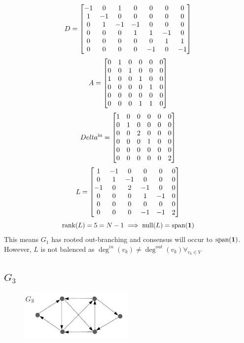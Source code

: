 \documentclass[]{article}
\numberwithin{equation}{section}
\begin{document}
\[
    D = \mqty[
        -1 & 0  & 1  & 0  & 0  & 0  & 0  \\
        1  & -1 & 0  & 0  & 0  & 0  & 0  \\
        0  & 1  & -1 & -1 & 0  & 0  & 0  \\
        0  & 0  & 0  & 1  & 1  & -1 & 0  \\
        0  & 0  & 0  & 0  & 0  & 1  & 1  \\
        0  & 0  & 0  & 0  & -1 & 0  & -1
    ]
\]\[
    A = \mqty[
        0 & 1 & 0 & 0 & 0 & 0 \\
        0 & 0 & 1 & 0 & 0 & 0 \\
        1 & 0 & 0 & 1 & 0 & 0 \\
        0 & 0 & 0 & 0 & 1 & 0 \\
        0 & 0 & 0 & 0 & 0 & 0 \\
        0 & 0 & 0 & 1 & 1 & 0
    ]
\]\[
    Delta^{\text{in}} = \mqty[
        1 & 0 & 0 & 0 & 0 & 0 \\
        0 & 1 & 0 & 0 & 0 & 0 \\
        0 & 0 & 2 & 0 & 0 & 0 \\
        0 & 0 & 0 & 1 & 0 & 0 \\
        0 & 0 & 0 & 0 & 0 & 0 \\
        0 & 0 & 0 & 0 & 0 & 2
    ]
\]\[
    L = \mqty[
        1  & -1 & 0  & 0  & 0  & 0 \\
        0  & 1  & -1 & 0  & 0  & 0 \\
        -1 & 0  & 2  & -1 & 0  & 0 \\
        0  & 0  & 0  & 1  & -1 & 0 \\
        0  & 0  & 0  & 0  & 0  & 0 \\
        0  & 0  & 0  & -1 & -1 & 2
    ]
\] \[
    \text{rank}(L) = 5 = N-1 \implies \text{null}(L) = \text{span}(\vb{1})
\] This means $G_1$ has rooted out-branching and consensus will occur to $\text{span}(\vb{1})$.
However, $L$ is not balenced as $\deg^{in}(v_k) \neq \deg^{out}(v_k) \forall_{v_k \in V}$

\newpage
\subsection{$G_3$}
\begin{figure}[h]
    \centering
    \includegraphics[width=0.5\textwidth]{figs/pblm6c.png}
\end{figure}
\end{document}

